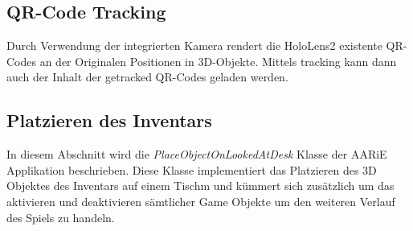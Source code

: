 \subsection{QR-Code Tracking}
Durch Verwendung der integrierten Kamera rendert die HoloLens2 existente QR-Codes an
der Originalen Positionen in 3D-Objekte. Mittels tracking kann dann auch der Inhalt
der getracked QR-Codes geladen werden.

\subsection{Platzieren des Inventars}
In diesem Abschnitt wird die \textit{PlaceObjectOnLookedAtDesk} Klasse der AARiE Applikation beschrieben. Diese Klasse
implementiert das Platzieren des 3D Objektes des Inventars auf einem Tischm und kümmert sich zusätzlich
um das aktivieren und deaktivieren sämtlicher Game Objekte um den weiteren Verlauf des Spiels zu handeln.

